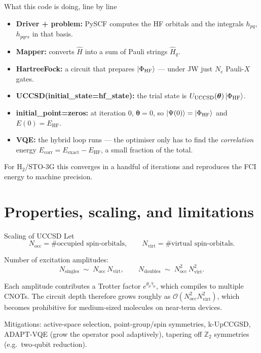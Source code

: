 \documentclass[10pt,aspectratio=169]{beamer}
\begin{document}
\begin{frame}{What this code is doing, line by line}
\begin{itemize}
  \item \textbf{Driver + problem:} PySCF computes the HF orbitals and the integrals $h_{pq}$, $h_{pqrs}$ in that basis.
  \item \textbf{Mapper:} converts $\hat H$ into a sum of Pauli strings $\hat H_q$.
  \item \textbf{HartreeFock:} a circuit that prepares $\ket{\Phi_{\mathrm{HF}}}$ --- under JW just $N_e$ Pauli-$X$ gates.
  \item \textbf{UCCSD(initial\_state=hf\_state):} the trial state is $U_{\mathrm{UCCSD}}(\bm\theta)\ket{\Phi_{\mathrm{HF}}}$.
  \item \textbf{initial\_point=zeros:} at iteration $0$, $\bm\theta=0$, so $\ket{\Psi(0)} = \ket{\Phi_{\mathrm{HF}}}$ and $E(0) = E_{\mathrm{HF}}$.
  \item \textbf{VQE:} the hybrid loop runs --- the optimiser only has to find the \emph{correlation} energy
        $E_{\mathrm{corr}} = E_{\mathrm{exact}} - E_{\mathrm{HF}}$, a small fraction of the total.
\end{itemize}

\medskip
For H$_2$/STO-3G this converges in a handful of iterations and reproduces the FCI energy to machine precision.
\end{frame}

\section{Properties, scaling, and limitations}

\begin{frame}{Scaling of UCCSD}
Let
\[
N_{\mathrm{occ}} = \text{\# occupied spin-orbitals},
\qquad
N_{\mathrm{virt}} = \text{\# virtual spin-orbitals}.
\]

Number of excitation amplitudes:
\[
N_{\mathrm{singles}} \;\sim\; N_{\mathrm{occ}}\,N_{\mathrm{virt}},
\qquad
N_{\mathrm{doubles}} \;\sim\; N_{\mathrm{occ}}^2\,N_{\mathrm{virt}}^2.
\]

\medskip
Each amplitude contributes a Trotter factor $e^{\theta_\mu \hat\tau_\mu}$, which compiles to multiple CNOTs.
The circuit depth therefore grows roughly as $\mathcal{O}(N_{\mathrm{occ}}^2 N_{\mathrm{virt}}^2)$,
which becomes prohibitive for medium-sized molecules on near-term devices.

\medskip
Mitigations: active-space selection, point-group/spin symmetries, k-UpCCGSD, ADAPT-VQE (grow the operator pool adaptively), tapering off $\mathbb{Z}_2$ symmetries (e.g.\ two-qubit reduction).
\end{frame}
\end{document}
